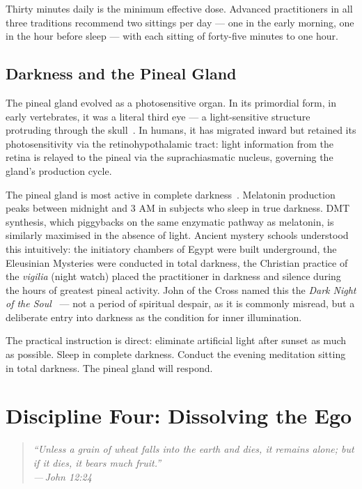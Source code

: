 \documentclass[12pt, a4paper]{article}
\newcommand{\epigraph}[2]{%
  \begin{quote}
    \itshape ``#1''\\[0.3em]
    \normalfont\small\hfill ---\,#2
  \end{quote}
}
\begin{document}
Thirty minutes daily is the minimum effective dose. Advanced practitioners in
all three traditions recommend two sittings per day — one in the early morning,
one in the hour before sleep — with each sitting of forty-five minutes to one
hour.

\subsection{Darkness and the Pineal Gland}

The pineal gland evolved as a photosensitive organ. In its primordial form, in
early vertebrates, it was a literal third eye — a light-sensitive structure
protruding through the skull~\autocite{strassman2001}. In humans, it has
migrated inward but retained its photosensitivity via the
retinohypothalamic tract: light information from the retina is relayed to the
pineal via the suprachiasmatic nucleus, governing the gland's production cycle.

The pineal gland is most active in complete darkness~\autocite{acosta2017}.
Melatonin production peaks between midnight and 3 AM in subjects who sleep
in true darkness. DMT synthesis, which piggybacks on the same enzymatic
pathway as melatonin, is similarly maximised in the absence of light. Ancient
mystery schools understood this intuitively: the initiatory chambers of Egypt
were built underground, the Eleusinian Mysteries were conducted in total
darkness, the Christian practice of the \emph{vigilia} (night watch) placed
the practitioner in darkness and silence during the hours of greatest pineal
activity. John of the Cross named this the \emph{Dark Night of the Soul}~\autocite{johnofcross1578}
— not a period of spiritual despair, as it is commonly misread, but a
deliberate entry into darkness as the condition for inner illumination.

The practical instruction is direct: eliminate artificial light after sunset as
much as possible. Sleep in complete darkness. Conduct the evening meditation
sitting in total darkness. The pineal gland will respond.

\section{Discipline Four: Dissolving the Ego}
\label{sec:ego}

\epigraph{Unless a grain of wheat falls into the earth and dies, it remains
alone; but if it dies, it bears much fruit.}{John 12:24}
\end{document}
